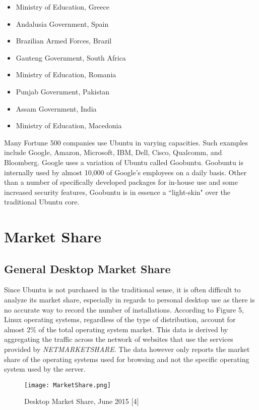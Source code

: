 \documentclass[11pt]{article}
\newcommand{\forceindent}{\leavevmode{\parindent=1em\indent}}
\begin{document}
\begin{multicols}{2}
\begin{itemize}
    \item Ministry of Education, Greece
    \item Andalusia Government, Spain
    \item Brazilian Armed Forces, Brazil
    \item Gauteng Government, South Africa
    \item Ministry of Education, Romania
    \item Punjab Government, Pakistan
    \item Assam Government, India
    \item Ministry of Education, Macedonia
\end{itemize}
\end{multicols}

Many Fortune 500 companies use Ubuntu in varying capacities. Such examples include Google, Amazon, Microsoft, IBM, Dell, Cisco, Qualcomm, and Bloomberg. Google uses a variation of Ubuntu called Goobuntu. Goobuntu is internally used by almost 10,000 of Google's employees on a daily basis. Other than a number of specifically developed packages for in-house use and some increased security features, Goobuntu is in essence a ``light-skin" over the traditional Ubuntu core.

\section{Market Share}
\subsection{General Desktop Market Share}

\forceindent Since Ubuntu is not purchased in the traditional sense, it is often difficult to analyze its market share, especially in regards to personal desktop use as there is no accurate way to record the number of installations. According to Figure 5, Linux operating systems, regardless of the type of distribution, account for almost 2\% of the total operating system market. This data is derived by aggregating the traffic across the network of websites that use the services provided by \emph{NETMARKETSHARE}. The data however only reports the market share of the operating systems used for browsing and not the specific operating system used by the server.\\

\begin{figure}[h!]
  \centering
    \caption{Desktop Market Share, June 2015 [4]}
{\texttt{[image: MarketShare.png]}}
\end{figure}
\end{document}
